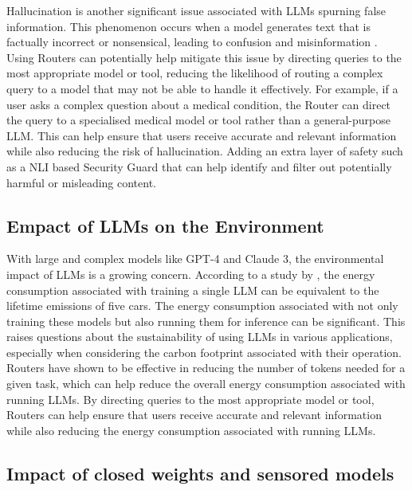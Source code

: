 Hallucination is another significant issue associated with LLMs spurning false information. This phenomenon occurs when a model generates text that is factually incorrect or nonsensical, leading to confusion and misinformation \citep{bender2021dangers}. Using Routers can potentially help mitigate this issue by directing queries to the most appropriate model or tool, reducing the likelihood of routing a complex query to a model that may not be able to handle it effectively. For example, if a user asks a complex question about a medical condition, the Router can direct the query to a specialised medical model or tool rather than a general-purpose LLM. This can help ensure that users receive accurate and relevant information while also reducing the risk of hallucination. Adding an extra layer of safety such as a NLI based Security Guard that can help identify and filter out potentially harmful or misleading content.

\subsection{Empact of LLMs on the Environment}
\label{sec:discussion-impact-of-llms-on-the-environment}

With large and complex models like GPT-4 and Claude 3, the environmental impact of LLMs is a growing concern. According to a study by \citep{strubell2019energypolicyconsiderationsdeep}, the energy consumption associated with training a single LLM can be equivalent to the lifetime emissions of five cars. The energy consumption associated with not only training these models but also running them for inference can be significant. This raises questions about the sustainability of using LLMs in various applications, especially when considering the carbon footprint associated with their operation. Routers have shown to be effective in reducing the number of tokens needed for a given task, which can help reduce the overall energy consumption associated with running LLMs. By directing queries to the most appropriate model or tool, Routers can help ensure that users receive accurate and relevant information while also reducing the energy consumption associated with running LLMs.

\subsection{Impact of closed weights and sensored models}
\label{sec:discussion-impact-of-closed-weights-and-sensored-models}

